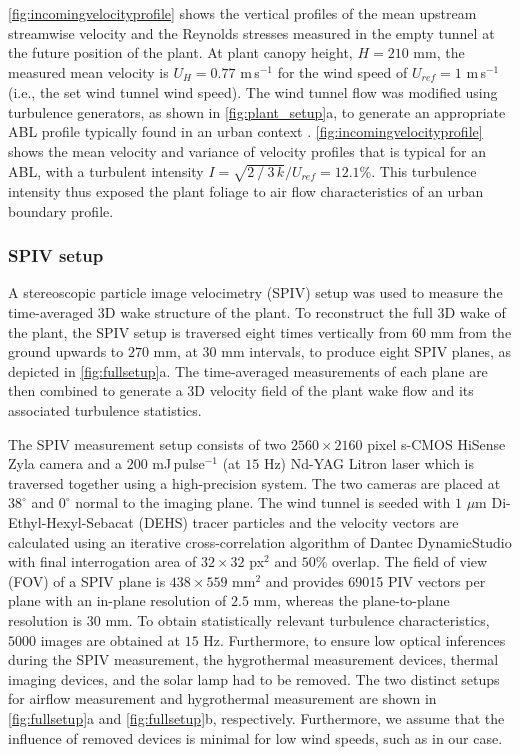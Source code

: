 \cref{fig:incomingvelocityprofile} shows the vertical profiles of the mean upstream streamwise velocity and the Reynolds stresses measured in the empty tunnel at the future position of the plant. At plant canopy height,  $H=210$ mm, the measured mean velocity is $U_H=0.77$ m\,s$^{-1}$  for the wind speed of $U_{\textit{ref}}=1$ m\,s$^{-1}$ (i.e., the set wind tunnel wind speed). The wind tunnel flow was modified using turbulence generators, as shown in \cref{fig:plant_setup}a, to generate an appropriate ABL profile typically found in an urban context \citep{Tsalicoglou2018}.  \cref{fig:incomingvelocityprofile} shows the mean velocity and variance of velocity profiles that is typical for an ABL, with a turbulent intensity $I=\sqrt{2⁄3\,k}/U_{\textit{ref}}= 12.1$\%. This turbulence intensity thus exposed the plant foliage to air flow characteristics of an urban boundary profile. 


\subsubsection*{SPIV setup}
A stereoscopic particle image velocimetry (SPIV) setup was used to measure the time-averaged 3D wake structure of the plant. To reconstruct the full 3D wake of the plant, the SPIV setup is traversed eight times vertically from $60$ mm from the ground upwards to $270$ mm, at $30$ mm intervals, to produce eight SPIV planes, as depicted in \cref{fig:fullsetup}a. The time-averaged measurements of each plane are then combined to generate a 3D velocity field of the plant wake flow and its associated turbulence statistics. 

The SPIV measurement setup consists of two $2560 \times 2160$ pixel s-CMOS HiSense Zyla camera and a $200$ mJ\,pulse$^{-1}$ (at $15$ Hz) Nd-YAG Litron laser which is traversed together using a high-precision system. The two cameras are placed at $38^{\circ}$ and $0^{\circ}$ normal to the imaging plane. The wind tunnel is seeded with $1$ $\mu$m Di-Ethyl-Hexyl-Sebacat (DEHS) tracer particles and the velocity vectors are calculated using an iterative cross-correlation algorithm of Dantec DynamicStudio with final interrogation area of $32\times32$ px$^2$ and $50$\%  overlap. The field of view (FOV) of a SPIV plane is $438\times559$ mm$^2$ and provides \num{69015} PIV vectors per plane with an in-plane resolution of $2.5$ mm, whereas the plane-to-plane resolution is $30$ mm. To obtain statistically relevant turbulence characteristics, $\num{5000}$ images are obtained at $15$ Hz. Furthermore, to ensure low optical inferences during the SPIV measurement, the hygrothermal measurement devices, thermal imaging devices, and the solar lamp had to be removed. The two distinct setups for airflow measurement and hygrothermal measurement are shown in \cref{fig:fullsetup}a and \cref{fig:fullsetup}b, respectively. Furthermore, we assume that the influence of removed devices is minimal for low wind speeds, such as in our case.

